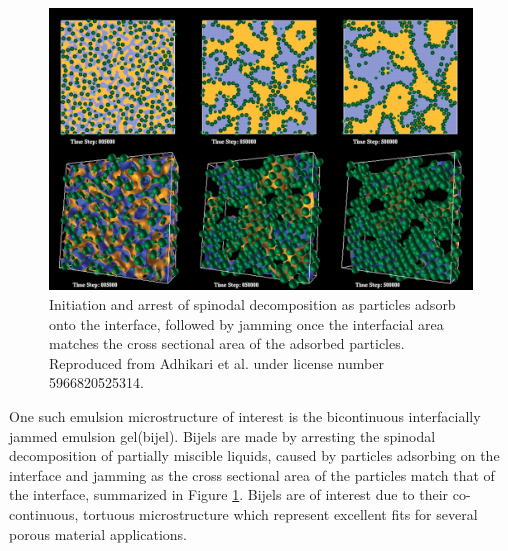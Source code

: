\begin{figure}
    \centering
    \includegraphics[scale = 0.3]{figures/introduction/bijel_coarsening.jpg}
    \caption{Initiation and arrest of spinodal decomposition as particles adsorb onto the interface, followed by jamming once the 
    interfacial area matches the cross sectional area of the adsorbed particles\cite{stratford_colloidal_2005}. Reproduced from Adhikari et al. 
    under license number 5966820525314.}
    \label{fig:bijel_coarsen}
\end{figure}

One such emulsion microstructure of interest is the bicontinuous interfacially jammed emulsion gel(bijel). 
\cite{stratford_colloidal_2005, herzig_bicontinuous_2007, lee_bicontinuous_2010} Bijels are made by arresting the spinodal decomposition of 
partially miscible liquids, caused by particles adsorbing on the interface and jamming as the cross sectional area of the particles match that 
of the interface, summarized in Figure \ref{fig:bijel_coarsen}. Bijels are of interest due to their co-continuous, tortuous microstructure which 
represent excellent fits for several porous material applications.

